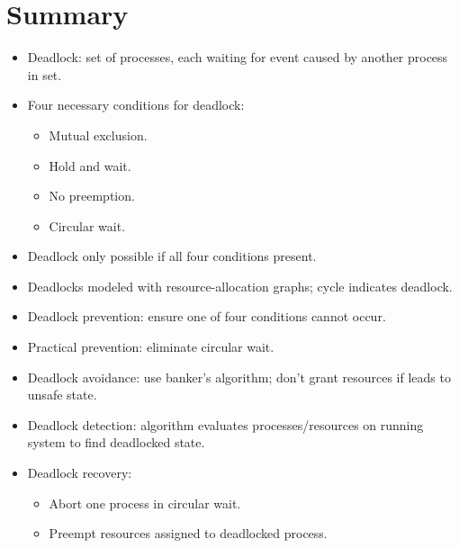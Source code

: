 \section{Summary}

\begin{itemize}
    \item Deadlock: set of processes, each waiting for event caused by another process in set.
    \item Four necessary conditions for deadlock:
    \begin{itemize}
        \item Mutual exclusion.
        \item Hold and wait.
        \item No preemption.
        \item Circular wait.
    \end{itemize}
    \item Deadlock only possible if all four conditions present.
    \item Deadlocks modeled with resource-allocation graphs; cycle indicates deadlock.
    \item Deadlock prevention: ensure one of four conditions cannot occur.
    \item Practical prevention: eliminate circular wait.
    \item Deadlock avoidance: use banker's algorithm; don't grant resources if leads to unsafe state.
    \item Deadlock detection: algorithm evaluates processes/resources on running system to find deadlocked state.
    \item Deadlock recovery:
    \begin{itemize}
        \item Abort one process in circular wait.
        \item Preempt resources assigned to deadlocked process.
    \end{itemize}
\end{itemize}
